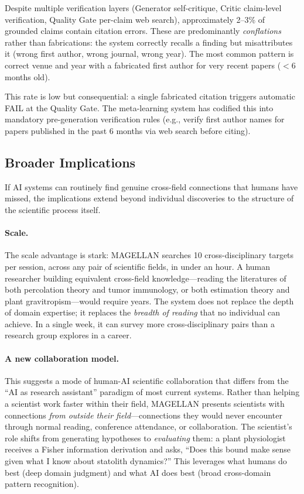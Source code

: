 Despite multiple verification layers (Generator self-critique, Critic claim-level verification, Quality Gate per-claim web search), approximately 2--3\% of grounded claims contain citation errors. These are predominantly \emph{conflations} rather than fabrications: the system correctly recalls a finding but misattributes it (wrong first author, wrong journal, wrong year). The most common pattern is correct venue and year with a fabricated first author for very recent papers ($<$6 months old).

This rate is low but consequential: a single fabricated citation triggers automatic FAIL at the Quality Gate. The meta-learning system has codified this into mandatory pre-generation verification rules (e.g., verify first author names for papers published in the past 6 months via web search before citing).

\subsection{Broader Implications}

If AI systems can routinely find genuine cross-field connections that humans have missed, the implications extend beyond individual discoveries to the structure of the scientific process itself.

\paragraph{Scale.} The scale advantage is stark: MAGELLAN searches 10 cross-disciplinary targets per session, across any pair of scientific fields, in under an hour. A human researcher building equivalent cross-field knowledge---reading the literatures of both percolation theory and tumor immunology, or both estimation theory and plant gravitropism---would require years. The system does not replace the depth of domain expertise; it replaces the \emph{breadth of reading} that no individual can achieve. In a single week, it can survey more cross-disciplinary pairs than a research group explores in a career.

\paragraph{A new collaboration model.} This suggests a mode of human-AI scientific collaboration that differs from the ``AI as research assistant'' paradigm of most current systems. Rather than helping a scientist work faster within their field, MAGELLAN presents scientists with connections \emph{from outside their field}---connections they would never encounter through normal reading, conference attendance, or collaboration. The scientist's role shifts from generating hypotheses to \emph{evaluating} them: a plant physiologist receives a Fisher information derivation and asks, ``Does this bound make sense given what I know about statolith dynamics?'' This leverages what humans do best (deep domain judgment) and what AI does best (broad cross-domain pattern recognition).

